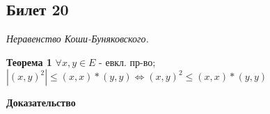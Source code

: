 \subsection{Билет 20}

\textit{Неравенство Коши-Буняковского.}

\textbf{Теорема 1} $\forall x,y \in E$ - евкл. пр-во; $\left | (x,y)^2 \right| \le  (x,x)*(y,y) \Leftrightarrow (x,y)^2 \le (x,x)*(y,y)$

\textbf{Доказательство}